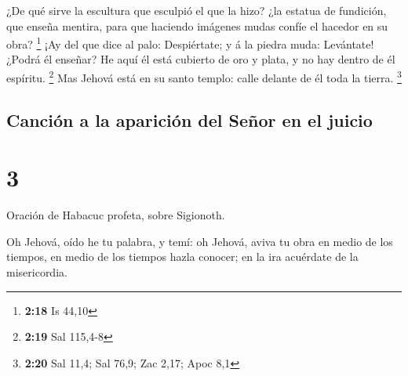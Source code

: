  ¿De qué sirve la escultura que esculpió el que la hizo?
¿la estatua de fundición, que enseña mentira, para que haciendo imágenes
mudas confíe el hacedor en su obra? \footnote{\textbf{2:18} Is 44,10}
 ¡Ay del que dice al palo: Despiértate; y á la piedra
muda: Levántate! ¿Podrá él enseñar? He aquí él está cubierto de oro y
plata, y no hay dentro de él espíritu. \footnote{\textbf{2:19} Sal
  115,4-8}  Mas Jehová está en su santo templo: calle
delante de él toda la tierra. \footnote{\textbf{2:20} Sal 11,4; Sal
  76,9; Zac 2,17; Apoc 8,1}

\hypertarget{canciuxf3n-a-la-apariciuxf3n-del-seuxf1or-en-el-juicio}{%
\subsection{Canción a la aparición del Señor en el
juicio}\label{canciuxf3n-a-la-apariciuxf3n-del-seuxf1or-en-el-juicio}}

\hypertarget{section-2}{%
\section{3}\label{section-2}}

 Oración de Habacuc profeta, sobre Sigionoth.

 Oh Jehová, oído he tu palabra, y temí: oh Jehová, aviva
tu obra en medio de los tiempos, en medio de los tiempos hazla conocer;
en la ira acuérdate de la misericordia.

